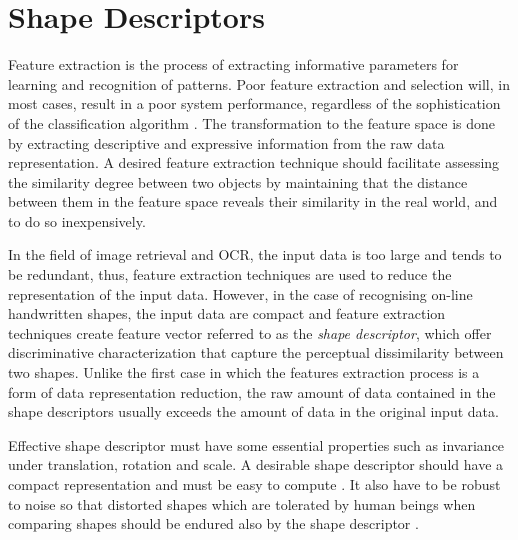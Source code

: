 \newpage{}

\section{Shape Descriptors}
\label{sec:feature_extraction}
\iftoggle{edit-mode}{\hspace{0pt}\marginpar{Feature extraction}}{}
Feature extraction is the process of extracting informative parameters for learning and recognition of patterns. 
Poor feature extraction and selection will, in most cases, result in a poor system performance, regardless of the sophistication of the classification algorithm \cite{parizeau2001character}.
The transformation to the feature space is done by extracting descriptive and expressive information from the raw data representation. 
A desired feature extraction technique should facilitate assessing the similarity degree between two objects by maintaining that the distance between them in the feature space reveals their similarity in the real world, and to do so inexpensively.

\iftoggle{edit-mode}{\hspace{0pt}\marginpar{Introduction - Cont.}}{}
In the field of image retrieval and OCR, the input data is too large and tends to be redundant, thus, feature extraction techniques are used to reduce the representation of the input data. 
However, in the case of recognising on-line handwritten shapes, the input data are compact and feature extraction techniques create feature vector referred to as the \emph{shape descriptor}, which offer discriminative characterization that capture the perceptual dissimilarity between two shapes. 
Unlike the first case in which the features extraction process is a form of data representation reduction, the raw amount of data contained in the shape descriptors usually exceeds the amount of data in the original input data.

\iftoggle{edit-mode}{\hspace{0pt}\marginpar{Shape Descriptors}}{}
Effective shape descriptor must have some essential properties such as invariance under translation, rotation and scale. 
A desirable shape descriptor should have a compact representation and must be easy to compute \cite{zhang2004review}.
It also have to be robust to noise so that distorted shapes which are tolerated by human beings when comparing shapes should be endured also by the shape descriptor \cite{zhang2004review, kim2000region}.


